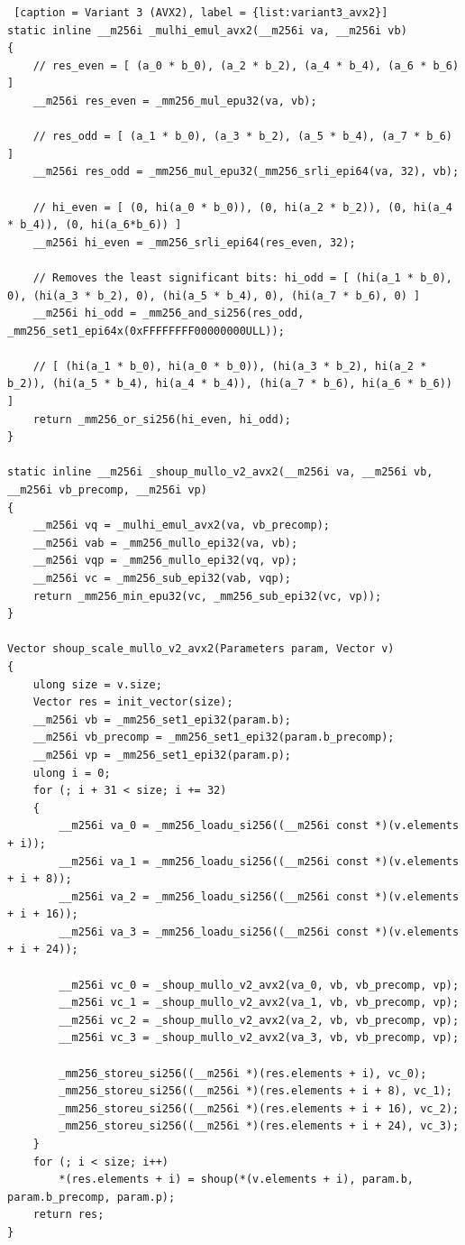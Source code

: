 \documentclass{article}
\begin{document}
\begin{lstlisting} [caption = Variant 3 (AVX2), label = {list:variant3_avx2}]
static inline __m256i _mulhi_emul_avx2(__m256i va, __m256i vb)
{
    // res_even = [ (a_0 * b_0), (a_2 * b_2), (a_4 * b_4), (a_6 * b_6) ]
    __m256i res_even = _mm256_mul_epu32(va, vb);

    // res_odd = [ (a_1 * b_0), (a_3 * b_2), (a_5 * b_4), (a_7 * b_6) ]
    __m256i res_odd = _mm256_mul_epu32(_mm256_srli_epi64(va, 32), vb);

    // hi_even = [ (0, hi(a_0 * b_0)), (0, hi(a_2 * b_2)), (0, hi(a_4 * b_4)), (0, hi(a_6*b_6)) ]
    __m256i hi_even = _mm256_srli_epi64(res_even, 32);

    // Removes the least significant bits: hi_odd = [ (hi(a_1 * b_0), 0), (hi(a_3 * b_2), 0), (hi(a_5 * b_4), 0), (hi(a_7 * b_6), 0) ]
    __m256i hi_odd = _mm256_and_si256(res_odd, _mm256_set1_epi64x(0xFFFFFFFF00000000ULL));

    // [ (hi(a_1 * b_0), hi(a_0 * b_0)), (hi(a_3 * b_2), hi(a_2 * b_2)), (hi(a_5 * b_4), hi(a_4 * b_4)), (hi(a_7 * b_6), hi(a_6 * b_6)) ]
    return _mm256_or_si256(hi_even, hi_odd);
}

static inline __m256i _shoup_mullo_v2_avx2(__m256i va, __m256i vb, __m256i vb_precomp, __m256i vp)
{
    __m256i vq = _mulhi_emul_avx2(va, vb_precomp);
    __m256i vab = _mm256_mullo_epi32(va, vb);
    __m256i vqp = _mm256_mullo_epi32(vq, vp);
    __m256i vc = _mm256_sub_epi32(vab, vqp);
    return _mm256_min_epu32(vc, _mm256_sub_epi32(vc, vp));
}

Vector shoup_scale_mullo_v2_avx2(Parameters param, Vector v)
{
    ulong size = v.size;
    Vector res = init_vector(size);
    __m256i vb = _mm256_set1_epi32(param.b);
    __m256i vb_precomp = _mm256_set1_epi32(param.b_precomp);
    __m256i vp = _mm256_set1_epi32(param.p);
    ulong i = 0;
    for (; i + 31 < size; i += 32)
    {
        __m256i va_0 = _mm256_loadu_si256((__m256i const *)(v.elements + i));
        __m256i va_1 = _mm256_loadu_si256((__m256i const *)(v.elements + i + 8));
        __m256i va_2 = _mm256_loadu_si256((__m256i const *)(v.elements + i + 16));
        __m256i va_3 = _mm256_loadu_si256((__m256i const *)(v.elements + i + 24));

        __m256i vc_0 = _shoup_mullo_v2_avx2(va_0, vb, vb_precomp, vp);
        __m256i vc_1 = _shoup_mullo_v2_avx2(va_1, vb, vb_precomp, vp);
        __m256i vc_2 = _shoup_mullo_v2_avx2(va_2, vb, vb_precomp, vp);
        __m256i vc_3 = _shoup_mullo_v2_avx2(va_3, vb, vb_precomp, vp);

        _mm256_storeu_si256((__m256i *)(res.elements + i), vc_0);
        _mm256_storeu_si256((__m256i *)(res.elements + i + 8), vc_1);
        _mm256_storeu_si256((__m256i *)(res.elements + i + 16), vc_2);
        _mm256_storeu_si256((__m256i *)(res.elements + i + 24), vc_3);
    }
    for (; i < size; i++)
        *(res.elements + i) = shoup(*(v.elements + i), param.b, param.b_precomp, param.p);
    return res;
}
\end{lstlisting}
\end{document}
